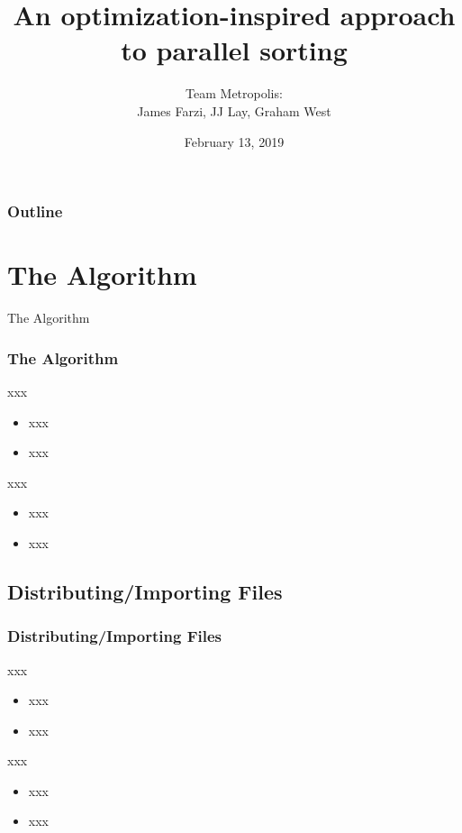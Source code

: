 \documentclass{beamer}
\title[Capstone]{An optimization-inspired approach to parallel sorting}
\author{Team Metropolis:\\
James Farzi, JJ Lay, Graham West}
\date{February 13, 2019}
\begin{document}
\frame{\titlepage}

\begin{frame}	
	\frametitle{Outline}
	\tableofcontents	
\end{frame}

\section{The Algorithm}

\begin{frame}	
	\begin{Huge}
		\begin{center}
			The Algorithm
		\end{center}
	\end{Huge}
\end{frame}

\begin{frame}	
	\frametitle{The Algorithm}
	
	\begin{block}{xxx}
		\begin{itemize}
			\item xxx
			\item xxx
		\end{itemize}
	\end{block}
	
	\begin{block}{xxx}
		\begin{itemize}
			\item xxx
			\item xxx
		\end{itemize}
	\end{block}
\end{frame}

\subsection{Distributing/Importing Files}

\begin{frame}	
	\frametitle{Distributing/Importing Files}
	
	\begin{block}{xxx}
		\begin{itemize}
			\item xxx
			\item xxx
		\end{itemize}
	\end{block}
	
	\begin{block}{xxx}
		\begin{itemize}
			\item xxx
			\item xxx
		\end{itemize}
	\end{block}
\end{frame}
\end{document}
